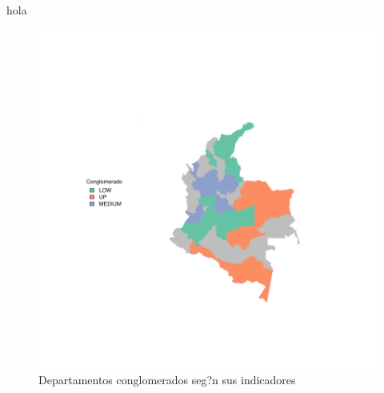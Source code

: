\documentclass{article}
\begin{document}
hola \cite{macqueen_methods_nodate}
\begin{figure}[h]
\centering
\begin{adjustbox}{}

\includegraphics{ProyectoFinal-plotMapa}
\end{adjustbox}
\caption{Departamentos conglomerados seg?n sus indicadores}\label{clustmap}
\end{figure}


\renewcommand{\refname}{Bibliografia}

\end{document}
